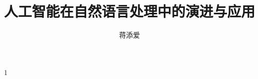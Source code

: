 \documentclass[]{SASSTeX}
\title{人工智能在自然语言处理中的演进与应用}
\author{蒋添爱}
\begin{document}
\MakeTitle[]

1\cite{a}



\end{document}
